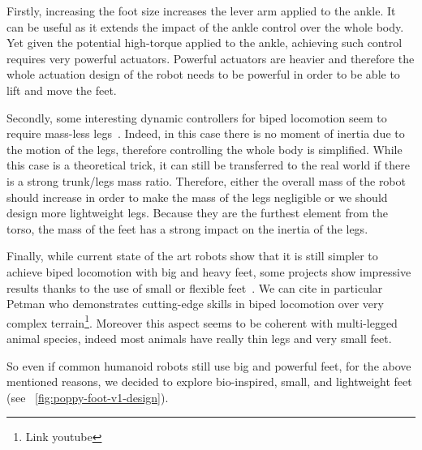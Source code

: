 Firstly, increasing the foot size increases the lever arm applied to the ankle. It can be useful as it extends the impact of the ankle control over the whole body. Yet given the potential high-torque applied to the ankle, achieving such control requires very powerful actuators.
Powerful actuators are heavier and therefore the whole actuation design of the robot needs to be powerful in order to be able to lift and move the feet.

Secondly, some interesting dynamic controllers for biped locomotion seem to require mass-less legs~\parencite{hyon2002development}. Indeed, in this case there is no moment of inertia due to the motion of the legs, therefore controlling the whole body is simplified. While this case is a theoretical trick, it can still be transferred to the real world if there is a strong trunk/legs mass ratio. Therefore, either the overall mass of the robot should increase in order to make the mass of the legs negligible or we should design more lightweight legs.
Because they are the furthest element from the torso, the mass of the feet has a strong impact on the inertia of the legs.

Finally, while current state of the art robots show that it is still simpler to achieve biped locomotion with big and heavy feet, some projects show impressive results thanks to the use of small or flexible feet~\parencite{bruneau2001dynamic}. We can cite in particular Petman who demonstrates cutting-edge skills in biped locomotion over very complex terrain\footnote{Link youtube}.
Moreover this aspect seems to be coherent with multi-legged animal species, indeed most animals have really thin legs and very small feet.

So even if common humanoid robots still use big and powerful feet, for the above mentioned reasons, we decided to explore bio-inspired, small, and lightweight feet (see \figurename~\ref{fig:poppy-foot-v1-design}).




